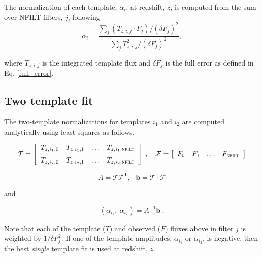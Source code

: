 \documentclass[11pt]{article}
\begin{document}
The normalization of each template, $\alpha_i$, at redshift, $z$, is computed
from the sum over \textsc{NFILT} filters, $j$, following
\begin{equation}
\alpha_i = \frac{ \displaystyle\sum_{j}
             \left({T_{z,i,j}\cdot F_j}\right)/\left(\delta F_j\right)^2}
           {\displaystyle\sum_j T_{z,i,j}^2/\left(\delta F_j\right)^2}, \label{eq:alpha1}
\end{equation}

\noindent where $T_{z,i,j}$ is the integrated template flux and $\delta F_j$ is
the full error as defined in Eq. \ref{full_error}.  

\subsection{Two template fit}

The two-template normalizations for templates $i_1$ and $i_2$ are computed analytically using least squares as follows.

\begin{equation}
\mathcal{T} = \left[
\begin {array}{cccc}
T_{z,i_1,0}& T_{z,i_1,1} & \ldots & T_{z,i_1,\textsc{nfilt}} \\
\noalign{\medskip}
T_{z,i_2,0}& T_{z,i_2,1} & \ldots & T_{z,i_2,\textsc{nfilt}} \\
\end {array}
\right]
\;,\ \ \  \mathcal{F} = \left[
\begin {array}{cccc}
F_0 & F_1 & \ldots & F_\textsc{nfilt} \\
\end {array}
\right]
\end{equation}

\begin{equation}
A = \mathcal{T}\mathcal{T}^\mathrm{T},\ \ \ 
\mathbf{b} = \mathcal{T}\cdot\mathcal{F}
\end{equation}

\noindent and 

\begin{equation}
\left(\alpha_{i_1},\ \alpha_{i_2}\right) = A^{-1}\mathbf{b}\ .
\end{equation}

Note that each of the template ($T$) and observed ($F$) fluxes above in filter
$j$ is weighted by $1/\delta F_j^2$. If one of the template amplitudes,
$\alpha_{i_1}$ or $\alpha_{i_2}$, is negative, then the best \textit{single}
template fit is used at redshift, $z$.
\end{document}
